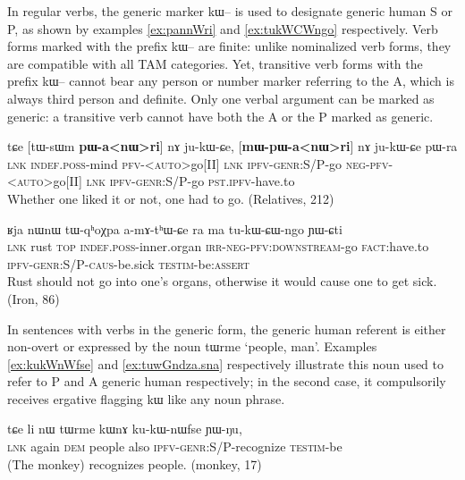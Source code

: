 \documentclass[oldfontcommands,oneside,a4paper,11pt]{article}
\newcommand{\ipa}[1]{{\phon \mbox{#1}}} %
\begin{document}


In regular verbs, the generic marker \ipa{kɯ--} is used to designate generic human S or P, as shown by examples \ref{ex:pannWri} and \ref{ex:tukWCWngo} respectively. Verb forms marked with the prefix \ipa{kɯ--} are  finite: unlike nominalized verb forms, they are compatible with all TAM categories. Yet, transitive verb forms with the prefix \ipa{kɯ--} cannot bear any person or number marker referring to the A, which is always third person and definite. Only one verbal argument can be marked as generic: a transitive verb cannot have both the A or the P marked as generic.


\begin{exe}
\ex  \label{ex:pannWri}
\gll
\ipa{tɕe}  	[\ipa{tɯ-sɯm}  	\textbf{\ipa{pɯ-a<nɯ>ri}}]  	\ipa{nɤ}  	\ipa{ju-kɯ-ɕe,}  	[\textbf{\ipa{mɯ-pɯ-a<nɯ>ri}}]  	\ipa{nɤ}  	\ipa{ju-kɯ-ɕe}  	\ipa{pɯ-ra}  \\
\textsc{lnk} \textsc{indef.poss}-mind  \textsc{pfv-<auto>}go[II] \textsc{lnk} \textsc{ipfv-genr}:S/P-go \textsc{neg-pfv-<auto>}go[II] \textsc{lnk} \textsc{ipfv-genr}:S/P-go \textsc{pst.ipfv}-have.to \\
\glt Whether one liked it or not, one had to go. (Relatives, 212)
\end{exe}


\begin{exe}
\ex \label{ex:tukWCWngo}
\gll  \ipa{tɕe} 	\ipa{ʁja} 	\ipa{nɯnɯ} 	\ipa{tɯ-qʰoχpa} 	\ipa{a-mɤ-tʰɯ-ɕe} 	\ipa{ra} 	\ipa{ma} 	\ipa{tu-kɯ-ɕɯ-ngo} 	\ipa{ɲɯ-ɕti} \\
\textsc{lnk} rust \textsc{top} \textsc{indef.poss}-inner.organ \textsc{irr-neg-pfv:downstream}-go \textsc{fact}:have.to \textsc{ipfv-genr:S/P-caus}-be.sick  \textsc{testim}-be:\textsc{assert} \\
\glt Rust should not go into one's organs, otherwise it would cause one to get sick. (Iron, 86)
\end{exe}

In sentences with verbs in the generic form, the generic  human referent is either non-overt or expressed by the noun \ipa{tɯrme} `people, man'. Examples \ref{ex:kukWnWfse} and \ref{ex:tuwGndza.sna} respectively illustrate this noun used to  refer to P and A generic human respectively; in the second case, it   compulsorily receives  ergative flagging \ipa{kɯ} like any   noun phrase.

\begin{exe}
\ex \label{ex:kukWnWfse}
\gll
\ipa{tɕe}  	\ipa{li}  	\ipa{nɯ}  	\ipa{tɯrme}  	\ipa{kɯnɤ}  	\ipa{ku-kɯ-nɯfse}  	\ipa{ɲɯ-ŋu,}\\
\textsc{lnk} again \textsc{dem} people also \textsc{ipfv-genr:S/P}-recognize \textsc{testim}-be\\
\glt  (The monkey) recognizes people. (monkey, 17)
\end{exe}
\end{document}
